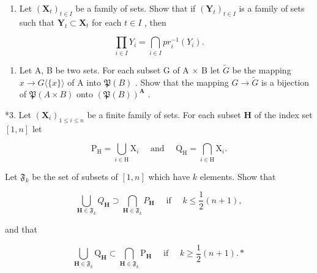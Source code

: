 \exercisegroup

\begin{enumerate}
\def\labelenumi{\arabic{enumi}.}
\tightlist
\item
  Let \((\mathbf{X}_t)_{t \in I}\) be a family of sets. Show that if \((\mathbf{Y}_t)_{t \in I}\) is a family of sets such that \(\mathbf{Y}_t \subset \mathbf{X}_t\) for each \(t \in I\) , then
\end{enumerate}

\[
\prod_ {i \in I} Y _ {i} = \bigcap_ {i \in I} p r _ {i} ^ {- 1} (Y _ {i}).
\]

\begin{enumerate}
\def\labelenumi{\arabic{enumi}.}
\setcounter{enumi}{1}
\tightlist
\item
  Let A, B be two sets. For each subset G of A × B let \(\tilde{G}\) be the mapping \(x \to G\langle\{x\}\rangle\) of A into \(\mathfrak{P}(B)\) . Show that the mapping \(G \to \tilde{G}\) is a bijection of \(\mathfrak{P}(A \times B)\) onto \((\mathfrak{P}(B))^{\mathbf{A}}\) .
\end{enumerate}

*3. Let \((\mathbf{X}_i)_{1\leqslant i\leqslant n}\) be a finite family of sets. For each subset \(\mathbf{H}\) of the index set \([1,n]\) let

\[
\mathrm{P} _ {\mathrm{H}} = \bigcup_ {i \in \mathrm{H}} \mathrm{X} _ {i} \quad \text { and } \quad \mathrm{Q} _ {\mathrm{H}} = \bigcap_ {i \in \mathrm{H}} \mathrm{X} _ {i}.
\]

Let \(\mathfrak{F}_k\) be the set of subsets of \([1, n]\) which have \(k\) elements. Show that

\[
\bigcup_ {\mathbf {H} \in \mathfrak {F} _ {k}} Q _ {\mathbf {H}} \supset \bigcap_ {\mathbf {H} \in \mathfrak {F} _ {k}} P _ {\mathbf {H}} \quad \text { if } \quad k \leqslant \frac {1}{2} (n + 1),
\]

and that

\[
\bigcup_ {\mathbf {H} \in \mathfrak {F} _ {k}} \mathrm{Q} _ {\mathbf {H}} \subset \bigcap_ {\mathbf {H} \in \mathfrak {F} _ {k}} \mathrm{P} _ {\mathbf {H}} \quad \text { if } \quad k \geqslant \frac {1}{2} (n + 1). *
\]

